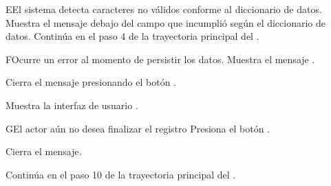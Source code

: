 \begin{UCtrayectoriaA}{E}{El sistema detecta caracteres no válidos conforme al diccionario de datos.}
	\UCpaso Muestra el mensaje  debajo del campo que incumplió según el diccionario de datos.
	\UCpaso Continúa en el paso 4 de la trayectoria principal del .
\end{UCtrayectoriaA}

\begin{UCtrayectoriaA}{F}{Ocurre un error al momento de persistir los datos.}
	\UCpaso Muestra el mensaje .
	
	\UCpaso[\UCactor] Cierra el mensaje presionando el botón .
	
	\UCpaso Muestra la interfaz de usuario .
\end{UCtrayectoriaA}

\begin{UCtrayectoriaA}{G}{El actor aún no desea finalizar el registro}
	\UCpaso[\UCactor] Presiona el botón .
	
	\UCpaso Cierra el mensaje.
	
	\UCpaso Continúa en el paso 10 de la trayectoria principal del .
\end{UCtrayectoriaA}